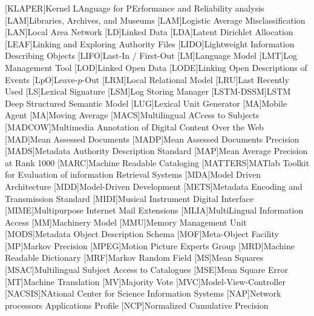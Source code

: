 [KLAPER]{Kernel LAnguage for PErformance and Reliability analysis}
[LAM]{Libraries, Archives, and Museums}
[LAM]{Logistic Average Misclassification}
[LAN]{Local Area Network}
[LD]{Linked Data}
[LDA]{Latent Dirichlet Allocation}
[LEAF]{Linking and Exploring Authority Files}
[LIDO]{Lightweight Information Describing Objects}
[LIFO]{Last-In / First-Out}
[LM]{Language Model}
[LMT]{Log Management Tool}
[LOD]{Linked Open Data}
[LODE]{Linking Open Descriptions of Events}
[LpO]{Leave-$p$-Out}
[LRM]{Local Relational Model}
[LRU]{Last Recently Used}
[LS]{Lexical Signature}
[LSM]{Log Storing Manager}
[LSTM-DSSM]{LSTM Deep Structured Semantic Model}
[LUG]{Lexical Unit Generator}
[MA]{Mobile Agent}
[MA]{Moving Average}
[MACS]{Multilingual ACcess to Subjects}
[MADCOW]{Multimedia Annotation of Digital Content Over the Web}
[MAD]{Mean Assessed Documents}
[MADP]{Mean Assessed Documents Precision}
[MADS]{Metadata Authority Description Standard}
[MAP]{Mean Average Precision at Rank 1000}
[MARC]{Machine Readable Cataloging}
[MATTERS]{MATlab Toolkit for Evaluation of information Retrieval Systems}
[MDA]{Model Driven Architecture}
[MDD]{Model-Driven Development}
[METS]{Metadata Encoding and Transmission Standard}
[MIDI]{Musical Instrument Digital Interface}
[MIME]{Multipurpose Internet Mail Extensions}
[MLIA]{MultiLingual Information Access}
[MM]{Machinery Model}
[MMU]{Memory Management Unit}
[MODS]{Metadata Object Description Schema}
[MOF]{Meta-Object Facility}
[MP]{Markov Precision}
[MPEG]{Motion Picture Experts Group}
[MRD]{Machine Readable Dictionary}
[MRF]{Markov Random Field}
[MS]{Mean Squares}
[MSAC]{Multilingual Subject Access to Catalogues}
[MSE]{Mean Square Error}
[MT]{Machine Translation}
[MV]{Majority Vote}
[MVC]{Model-View-Controller}
[NACSIS]{NAtional Center for Science Information Systems}
[NAP]{Network processors Applications Profile}
[NCP]{Normalized Cumulative Precision}
